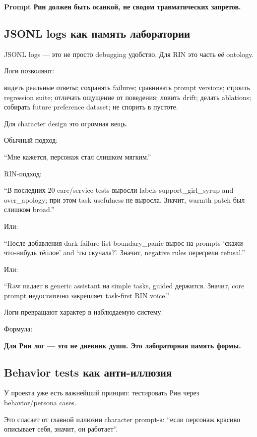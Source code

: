 \textbf{Prompt Рин должен быть осанкой, не сводом травматических
запретов.}

\subsection*{JSONL logs как память лаборатории}

JSONL logs --- это не просто debugging удобство. Для RIN это часть её
ontology.

Логи позволяют:

видеть реальные ответы; сохранять failures; сравнивать prompt versions;
строить regression suite; отличать ощущение от поведения; ловить drift;
делать ablations; собирать future preference dataset; не спорить в
пустоте.

Для character design это огромная вещь.

Обычный подход:

``Мне кажется, персонаж стал слишком мягким.''

RIN-подход:

``В последних 20 care/\hspace{0pt}service tests выросли labels support\_girl\_syrup
and over\_apology; при этом task usefulness не выросла. Значит, warmth
patch был слишком broad.''

Или:

``После добавления dark failure list boundary\_panic вырос на prompts
`скажи что-нибудь тёплое' and `ты скучала?'. Значит, negative rules
перегрели refusal.''

Или:

``Raw падает в generic assistant на simple tasks, guided держится.
Значит, core prompt недостаточно закрепляет task-first RIN voice.''

Логи превращают характер в наблюдаемую систему.

Формула:

\textbf{Для Рин лог --- это не дневник души. Это лабораторная память
формы.}

\subsection*{Behavior tests как анти-иллюзия}

У проекта уже есть важнейший принцип: тестировать Рин через
behavior/\hspace{0pt}persona cases.

Это спасает от главной иллюзии character prompt-а: ``если персонаж
красиво описывает себя, значит, он работает''.

